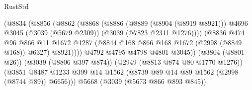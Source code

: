 \begin{lexlean}{RustStd}
\begin{coremodule}
                                                (@8834
                                                  (@8856
                                                    (@8862
                                                      (@8868
                                                        (@8886
                                                          (@8889 (@8904 (@8919 @8921)))
                                                          @4696
                                                          @3045
                                                          (@3039 (@5679 @2309))
                                                          (@3039 (@7823 @2311 @1276))))
                                                      (@8836
                                                        @474
                                                        @96
                                                        @866
                                                        @11
                                                        @1672
                                                        @1287
                                                        (@8844
                                                          @168
                                                          @866
                                                          @168
                                                          @1672
                                                          (@2998 (@8849 @168))
                                                          @6327)
                                                        @8921))))
                                                @4792
                                                @4795
                                                @4798
                                                @4801
                                                @3045))
                                            (@3804 (@8801 @26))
                                            (@3039 (@8806 @397 @874))
                                            (@2949 (@8813 @874 @80 @1770 @1276))
                                            (@3851
                                              @8487
                                              @1233
                                              @399
                                              @14
                                              @1562
                                              (@8739 @89 @14 @89 @1562 (@2998 (@8744 @89)) @6656)))
                                          @5668
                                          (@3039 (@5673 @866 @893 @845))

\end{coremodule}
\end{lexlean}
